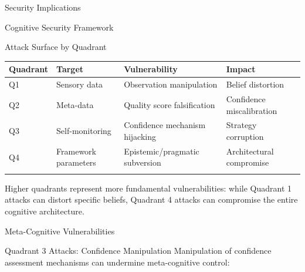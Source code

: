 \documentclass[
  ignorenonframetext,
]{beamer}
\newcounter{none} %
\begin{document}
\begin{frame}{Security Implications}
\begin{block}{Cognitive Security Framework}
\begin{block}{Attack Surface by Quadrant}
\protect{}\label{attack-surface-by-quadrant}
{\def\LTcaptype{none} %
\begin{longtable}[]{@{}
  >{\raggedright\arraybackslash}p{}
  >{\raggedright\arraybackslash}p{}
  >{\raggedright\arraybackslash}p{}
  >{\raggedright\arraybackslash}p{}@{}}
\toprule\noalign{}
\begin{minipage}[b]{\linewidth}\raggedright
Quadrant
\end{minipage} & \begin{minipage}[b]{\linewidth}\raggedright
Target
\end{minipage} & \begin{minipage}[b]{\linewidth}\raggedright
Vulnerability
\end{minipage} & \begin{minipage}[b]{\linewidth}\raggedright
Impact
\end{minipage} \\
\midrule\noalign{}
\endhead
Q1 & Sensory data & Observation manipulation & Belief distortion \\
Q2 & Meta-data & Quality score falsification & Confidence
miscalibration \\
Q3 & Self-monitoring & Confidence mechanism hijacking & Strategy
corruption \\
Q4 & Framework parameters & Epistemic/pragmatic subversion &
Architectural compromise \\
\bottomrule\noalign{}
\end{longtable}
}

Higher quadrants represent more fundamental vulnerabilities: while
Quadrant 1 attacks can distort specific beliefs, Quadrant 4 attacks can
compromise the entire cognitive architecture.
\end{block}
\end{block}

\begin{block}{Meta-Cognitive Vulnerabilities}
\protect{}\label{sec:vulnerabilities}
\begin{block}{Quadrant 3 Attacks: Confidence Manipulation}
\protect{}\label{quadrant-3-attacks-confidence-manipulation}
Manipulation of confidence assessment mechanisms can undermine
meta-cognitive control:


\end{block}
\end{block}
\end{frame}
\end{document}
